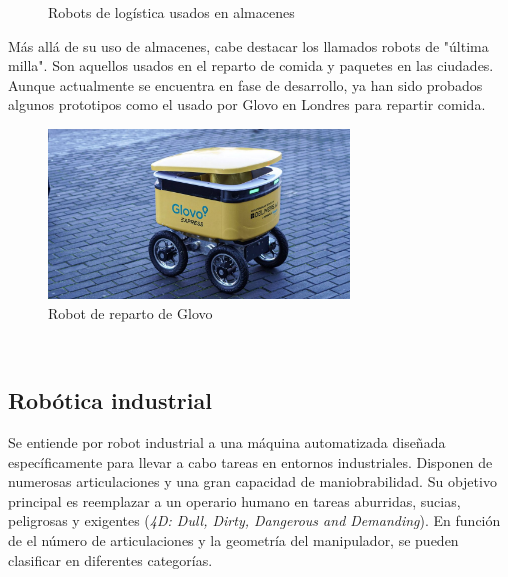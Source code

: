 \begin{figure} [ht!]
    \centering    
    \hspace{1cm}
    \caption{Robots de logística usados en almacenes}
\end{figure}

Más allá de su uso de almacenes, cabe destacar los llamados robots de "última milla". Son aquellos usados en el reparto de comida y 
paquetes en las ciudades. Aunque actualmente se encuentra en fase de desarrollo, ya han sido probados algunos 
prototipos como el usado por Glovo en Londres para repartir comida.
\begin{figure} [ht!]
    \begin{center}
      \includegraphics[width=8cm]{figs/reparto.jpg}
    \end{center}
    \caption{Robot de reparto de Glovo}
    \label{fig:glovo}
\end{figure}\ 

\newpage
\subsection{Robótica industrial}
\label{sec:rob_industrial}
Se entiende por robot industrial a una máquina automatizada diseñada específicamente para llevar a cabo tareas en entornos industriales. 
Disponen de numerosas articulaciones y una gran capacidad de maniobrabilidad. Su objetivo principal es reemplazar a un 
operario humano en tareas aburridas, sucias, peligrosas y exigentes (\textit{4D: Dull, Dirty, Dangerous and Demanding}).
En función de el número de articulaciones y la geometría del manipulador, se pueden clasificar en diferentes categorías.

